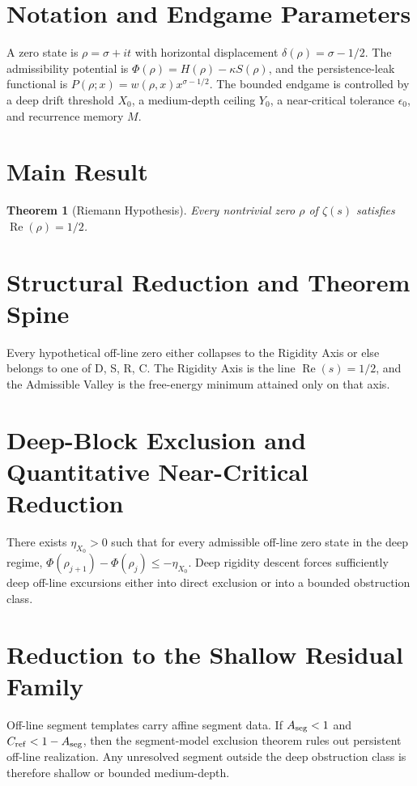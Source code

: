 \documentclass[11pt,a4paper]{article}
\newtheorem{theorem}{Theorem}
\begin{document}
\section{Notation and Endgame Parameters}
A zero state is \(\rho = \sigma + it\) with horizontal displacement \(\delta(\rho) = \sigma - 1/2\). The admissibility potential is \(\Phi(\rho) = H(\rho) - \kappa S(\rho)\), and the persistence-leak functional is \(P(\rho; x) = w(\rho, x) x^{\sigma - 1/2}\). The bounded endgame is controlled by a deep drift threshold \(X_0\), a medium-depth ceiling \(Y_0\), a near-critical tolerance \(\epsilon_0\), and recurrence memory \(M\).

\section{Main Result}
\begin{theorem}[Riemann Hypothesis]
Every nontrivial zero \(\rho\) of \(\zeta(s)\) satisfies \(\operatorname{Re}(\rho) = 1/2\).
\end{theorem}

\section{Structural Reduction and Theorem Spine}
Every hypothetical off-line zero either collapses to the Rigidity Axis or else belongs to one of D, S, R, C. The Rigidity Axis is the line \(\operatorname{Re}(s) = 1/2\), and the Admissible Valley is the free-energy minimum attained only on that axis.

\section{Deep-Block Exclusion and Quantitative Near-Critical Reduction}
There exists \(\eta_{X_0} > 0\) such that for every admissible off-line zero state in the deep regime, \(\Phi(\rho_{j+1}) - \Phi(\rho_j) \le -\eta_{X_0}\). Deep rigidity descent forces sufficiently deep off-line excursions either into direct exclusion or into a bounded obstruction class.

\section{Reduction to the Shallow Residual Family}
Off-line segment templates carry affine segment data. If \(A_{\rm seg} < 1\) and \(C_{\rm ref} < 1 - A_{\rm seg}\), then the segment-model exclusion theorem rules out persistent off-line realization. Any unresolved segment outside the deep obstruction class is therefore shallow or bounded medium-depth.
\end{document}
